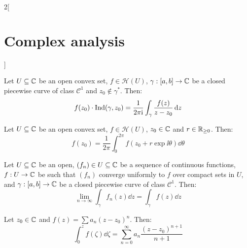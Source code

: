 \documentclass[../../../main_math.tex]{subfiles}
\begin{document}
\begin{multicols}{2}[\section{Complex analysis}]
\begin{theorem}
  \end{theorem}
  \begin{theorem}
    Let $U\subseteq\mathbb{C}$ be an open convex set, $f\in\mathcal{H}(U)$, $\gamma:[a,b]\rightarrow\mathbb{C}$ be a closed piecewise curve of class $\mathcal{C}^1$ and $z_0\notin\gamma^*$. Then:
    $$f(z_0)\cdot\operatorname{Ind}(\gamma,z_0)=\frac{1}{2\pi\mathrm{i}}\int_\gamma\frac{f(z)}{z-z_0}\dd{z}$$
  \end{theorem}
  \begin{corollary}
    Let $U\subseteq\mathbb{C}$ be an open convex set, $f\in\mathcal{H}(U)$, $z_0\in\mathbb{C}$ and $r\in\mathbb{R}_{\geq 0}$. Then:
    $$f(z_0)=\frac{1}{2\pi}\int_0^{2\pi}f(z_0+r\exp{\ii\theta})\dd{\theta}$$
  \end{corollary}
  \begin{lemma}
    Let $U\subseteq\mathbb{C}$ be an open, $(f_n)\in U\subseteq\mathbb{C}$ be a sequence of continuous functions, $f:U\rightarrow\mathbb{C}$ be such that $(f_n)$ converge uniformly to $f$ over compact sets in $U$, and $\gamma:[a,b]\rightarrow\mathbb{C}$ be a closed piecewise curve of class $\mathcal{C}^1$. Then:
    $$\lim_{n\to\infty}\int_\gamma f_n(z)\dd{z}=\int_\gamma f(z)\dd{z}$$
  \end{lemma}
  \begin{corollary}
    Let $z_0\in\mathbb{C}$ and $f(z)=\sum a_n{(z-z_0)}^n$. Then:
    $$\int_0^z f(\zeta)\dd{\zeta}=\sum_{n=0}^\infty a_n\frac{{(z-z_0)}^{n+1}}{n+1}$$
  \end{corollary}

\end{multicols}
\end{document}

